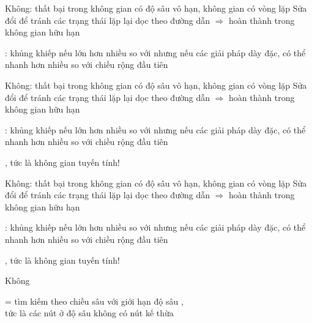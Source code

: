 \documentclass{article}
\begin{document}
\begin{huge}


 Không: thất bại trong không gian có độ sâu vô hạn, không gian có vòng lặp\nl
Sửa đổi để tránh các trạng thái lặp lại dọc theo đường dẫn \nnl
$\Rightarrow$ hoàn thành trong không gian hữu hạn

 : khủng khiếp nếu  lớn hơn nhiều so với \nl
        nhưng nếu các giải pháp dày đặc, có thể nhanh hơn nhiều so với chiều rộng đầu tiên



 Không: thất bại trong không gian có độ sâu vô hạn, không gian có vòng lặp\nl
Sửa đổi để tránh các trạng thái lặp lại dọc theo đường dẫn \nnl
$\Rightarrow$ hoàn thành trong không gian hữu hạn

 : khủng khiếp nếu  lớn hơn nhiều so với \nl
        nhưng nếu các giải pháp dày đặc, có thể nhanh hơn nhiều so với chiều rộng đầu tiên

 , tức là không gian tuyến tính!



 Không: thất bại trong không gian có độ sâu vô hạn, không gian có vòng lặp\nl
Sửa đổi để tránh các trạng thái lặp lại dọc theo đường dẫn \nnl
$\Rightarrow$ hoàn thành trong không gian hữu hạn

 : khủng khiếp nếu  lớn hơn nhiều so với \nl
        nhưng nếu các giải pháp dày đặc, có thể nhanh hơn nhiều so với chiều rộng đầu tiên

 , tức là không gian tuyến tính!

 Không



= tìm kiếm theo chiều sâu với giới hạn độ sâu ,\\
tức là các nút ở độ sâu  không có nút kế thừa


\end{huge}
\end{document}
